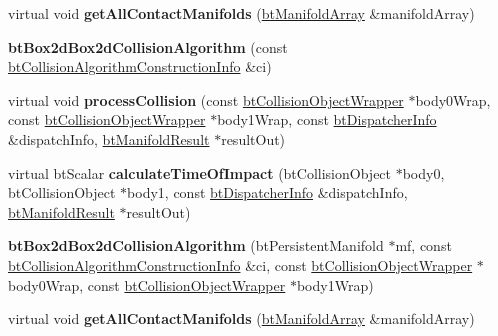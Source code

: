 \begin{DoxyCompactItemize}
\item 
\mbox{\label{classbtBox2dBox2dCollisionAlgorithm_a2cd6900f9965d1d9a9dde43037fe0631}} 
virtual void {\bfseries get\+All\+Contact\+Manifolds} (\hyperlink{classbtAlignedObjectArray}{bt\+Manifold\+Array} \&manifold\+Array)
\item 
\mbox{\label{classbtBox2dBox2dCollisionAlgorithm_ada986fe8e7553712794c54b4fe1083b7}} 
{\bfseries bt\+Box2d\+Box2d\+Collision\+Algorithm} (const \hyperlink{structbtCollisionAlgorithmConstructionInfo}{bt\+Collision\+Algorithm\+Construction\+Info} \&ci)
\item 
\mbox{\label{classbtBox2dBox2dCollisionAlgorithm_aa8bd59265f7150020f1797bb38ca9605}} 
virtual void {\bfseries process\+Collision} (const \hyperlink{structbtCollisionObjectWrapper}{bt\+Collision\+Object\+Wrapper} $\ast$body0\+Wrap, const \hyperlink{structbtCollisionObjectWrapper}{bt\+Collision\+Object\+Wrapper} $\ast$body1\+Wrap, const \hyperlink{structbtDispatcherInfo}{bt\+Dispatcher\+Info} \&dispatch\+Info, \hyperlink{classbtManifoldResult}{bt\+Manifold\+Result} $\ast$result\+Out)
\item 
\mbox{\label{classbtBox2dBox2dCollisionAlgorithm_a56f9e09abf9e45d14b9a6937857c8dab}} 
virtual bt\+Scalar {\bfseries calculate\+Time\+Of\+Impact} (bt\+Collision\+Object $\ast$body0, bt\+Collision\+Object $\ast$body1, const \hyperlink{structbtDispatcherInfo}{bt\+Dispatcher\+Info} \&dispatch\+Info, \hyperlink{classbtManifoldResult}{bt\+Manifold\+Result} $\ast$result\+Out)
\item 
\mbox{\label{classbtBox2dBox2dCollisionAlgorithm_accd5db2c4a57139e641ad36c1df4d9d8}} 
{\bfseries bt\+Box2d\+Box2d\+Collision\+Algorithm} (bt\+Persistent\+Manifold $\ast$mf, const \hyperlink{structbtCollisionAlgorithmConstructionInfo}{bt\+Collision\+Algorithm\+Construction\+Info} \&ci, const \hyperlink{structbtCollisionObjectWrapper}{bt\+Collision\+Object\+Wrapper} $\ast$body0\+Wrap, const \hyperlink{structbtCollisionObjectWrapper}{bt\+Collision\+Object\+Wrapper} $\ast$body1\+Wrap)
\item 
\mbox{\label{classbtBox2dBox2dCollisionAlgorithm_a2cd6900f9965d1d9a9dde43037fe0631}} 
virtual void {\bfseries get\+All\+Contact\+Manifolds} (\hyperlink{classbtAlignedObjectArray}{bt\+Manifold\+Array} \&manifold\+Array)
\end{DoxyCompactItemize}
